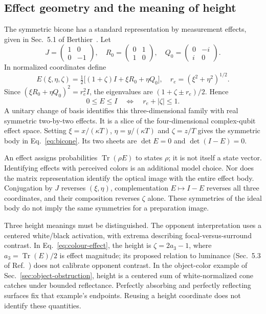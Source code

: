 \documentclass[11pt,letterpaper]{article}
\theoremstyle{plain}
\begin{document}
\subsection{Effect geometry and the meaning of height}
\label{sec:effect-body}
The symmetric bicone has a standard representation by measurement effects, given in Sec.~5.1 of Berthier~\cite{Berthier2020}. Let
\begin{equation}
 J=\begin{pmatrix}1&0\\0&-1\end{pmatrix},\quad
 R_0=\begin{pmatrix}0&1\\1&0\end{pmatrix},\quad
 Q_0=\begin{pmatrix}0&-i\\i&0\end{pmatrix}.
 \label{eq:effect-pauli}
\end{equation}
In normalized coordinates define
\begin{equation}
 E(\xi,\eta,\zeta)=\tfrac12\bigl[(1+\zeta)I+\xi R_0+\eta Q_0\bigr],
 \quad r_e=(\xi^2+\eta^2)^{1/2}.
 \label{eq:colour-effect}
\end{equation}
Since $(\xi R_0+\eta Q_0)^2=r_e^2I$, the eigenvalues are $(1+\zeta\pm r_e)/2$. Hence
\begin{equation}
 0\leq E\leq I\quad\Longleftrightarrow\quad r_e+|\zeta|\leq1.
 \label{eq:effect-bicone}
\end{equation}
A unitary change of basis identifies this three-dimensional family with real symmetric two-by-two effects. It is a slice of the four-dimensional complex-qubit effect space. Setting $\xi=x/(\kappa T)$, $\eta=y/(\kappa T)$ and $\zeta=z/T$ gives the symmetric body in Eq.~\eqref{eq:bicone}. Its two sheets are $\det E=0$ and $\det(I-E)=0$.

An effect assigns probabilities $\operatorname{Tr}(\rho E)$ to states $\rho$; it is not itself a state vector. Identifying effects with perceived colors is an additional model choice. Nor does the matrix representation identify the optical image with the entire effect body. Conjugation by $J$ reverses $(\xi,\eta)$, complementation $E\mapsto I-E$ reverses all three coordinates, and their composition reverses $\zeta$ alone. These symmetries of the ideal body do not imply the same symmetries for a preparation image.

Three height meanings must be distinguished. The opponent interpretation uses a centered white/black activation, with extrema describing focal-versus-surround contrast. In Eq.~\eqref{eq:colour-effect}, the height is $\zeta=2a_3-1$, where $a_3=\operatorname{Tr}(E)/2$ is effect magnitude; its proposed relation to luminance (Sec.~5.3 of Ref.~\cite{BerthierProvenzi2022}) does not calibrate opponent contrast. In the object-color example of Sec.~\ref{sec:object-obstruction}, height is a centered sum of white-normalized cone catches under bounded reflectance. Perfectly absorbing and perfectly reflecting surfaces fix that example's endpoints. Reusing a height coordinate does not identify these quantities.
\end{document}
